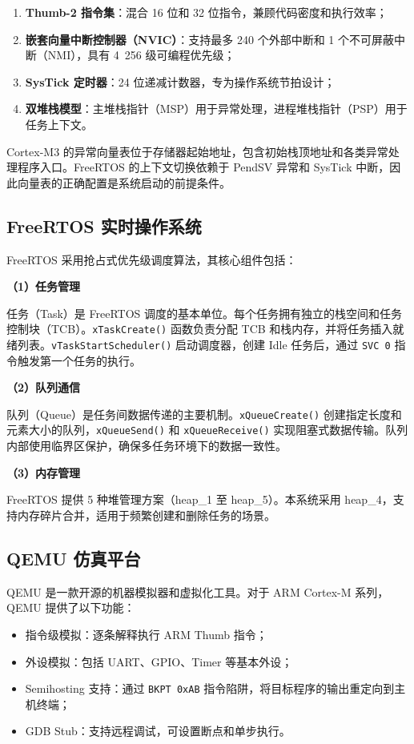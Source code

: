 \documentclass[12pt,a4paper]{ctexart}
\begin{document}
\begin{enumerate}[leftmargin=2em]
    \item \textbf{Thumb-2 指令集}：混合 16 位和 32 位指令，兼顾代码密度和执行效率；
    \item \textbf{嵌套向量中断控制器（NVIC）}：支持最多 240 个外部中断和 1 个不可屏蔽中断（NMI），具有 4~256 级可编程优先级；
    \item \textbf{SysTick 定时器}：24 位递减计数器，专为操作系统节拍设计；
    \item \textbf{双堆栈模型}：主堆栈指针（MSP）用于异常处理，进程堆栈指针（PSP）用于任务上下文。
\end{enumerate}

Cortex-M3 的异常向量表位于存储器起始地址，包含初始栈顶地址和各类异常处理程序入口。FreeRTOS 的上下文切换依赖于 PendSV 异常和 SysTick 中断，因此向量表的正确配置是系统启动的前提条件。

\subsection{FreeRTOS 实时操作系统}

FreeRTOS 采用抢占式优先级调度算法，其核心组件包括：

\textbf{（1）任务管理}

任务（Task）是 FreeRTOS 调度的基本单位。每个任务拥有独立的栈空间和任务控制块（TCB）。\texttt{xTaskCreate()} 函数负责分配 TCB 和栈内存，并将任务插入就绪列表。\texttt{vTaskStartScheduler()} 启动调度器，创建 Idle 任务后，通过 \texttt{SVC 0} 指令触发第一个任务的执行。

\textbf{（2）队列通信}

队列（Queue）是任务间数据传递的主要机制。\texttt{xQueueCreate()} 创建指定长度和元素大小的队列，\texttt{xQueueSend()} 和 \texttt{xQueueReceive()} 实现阻塞式数据传输。队列内部使用临界区保护，确保多任务环境下的数据一致性。

\textbf{（3）内存管理}

FreeRTOS 提供 5 种堆管理方案（heap\_1 至 heap\_5）。本系统采用 heap\_4，支持内存碎片合并，适用于频繁创建和删除任务的场景。

\subsection{QEMU 仿真平台}

QEMU 是一款开源的机器模拟器和虚拟化工具。对于 ARM Cortex-M 系列，QEMU 提供了以下功能：

\begin{itemize}[leftmargin=2em]
    \item 指令级模拟：逐条解释执行 ARM Thumb 指令；
    \item 外设模拟：包括 UART、GPIO、Timer 等基本外设；
    \item Semihosting 支持：通过 \texttt{BKPT 0xAB} 指令陷阱，将目标程序的输出重定向到主机终端；
    \item GDB Stub：支持远程调试，可设置断点和单步执行。
\end{itemize}
\end{document}
